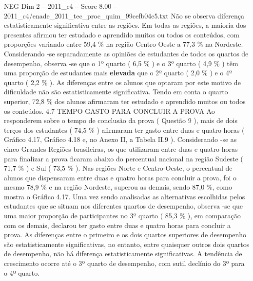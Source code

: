 \begin{textsample}{NEG Dim 2 – 2011\_c4 – Score 8.00 – 2011\_c4/enade\_2011\_tec\_proc\_quim\_99cefb04e5.txt}
Não se observa diferença estatisticamente significativa entre as regiões.
Em todas as regiões, a maioria dos presentes afirmou ter estudado e aprendido muitos ou todos os conteúdos, com proporções variando entre 59,4 \% na região Centro-Oeste a 77,3 \% na Nordeste.
Considerando -se separadamente as opiniões de estudantes de todos os quartos de desempenho, observa -se que o 1º quarto ( 6,5 \% ) e o 3º quarto ( 4,9 \% ) têm uma proporção de estudantes mais \textbf{elevada} que o 2º quarto ( 2,0 \% ) e o 4º quarto ( 2,2 \% ).
As diferenças entre os alunos que optaram por este motivo de dificuldade não são estatisticamente significativa.
Tendo em conta o quarto superior, 72,8 \% dos alunos afirmaram ter estudado e aprendido muitos ou todos os conteúdos. 4.7 TEMPO GASTO PARA CONCLUIR A PROVA Ao responderem sobre o tempo de conclusão da prova ( Questão 9 ), mais de dois terços dos estudantes ( 74,5 \% ) afirmaram ter gasto entre duas e quatro horas ( Gráfico 4.17, Gráfico 4.18 e, no Anexo II, a Tabela II.9 ).
Considerando -se as cinco Grandes Regiões brasileiras, os que utilizaram entre duas e quatro horas para finalizar a prova ficaram abaixo do percentual nacional na região Sudeste ( 71,7 \% ) e Sul ( 73,5 \% ).
Nas regiões Norte e Centro-Oeste, o percentual de alunos que dispensaram entre duas e quatro horas para concluir a prova, foi o mesmo 78,9 \% e na região Nordeste, superou as demais, sendo 87,0 \%, como mostra o Gráfico 4.17.
Uma vez sendo analisadas as alternativas escolhidas pelos estudantes que se situam nos diferentes quartos de desempenho, observa -se que uma maior proporção de participantes no 3º quarto ( 85,3 \% ), em comparação com os demais, declarou ter gasto entre duas e quatro horas para concluir a prova.
As diferenças entre o primeiro e os dois quartos superiores de desempenho são estatisticamente significativas, no entanto, entre quaisquer outros dois quartos de desempenho, não há diferença estatisticamente significativas.
A tendência de crescimento ocorre até o 3º quarto de desempenho, com sutil declínio do 3º para o 4º quarto.

\end{textsample}
